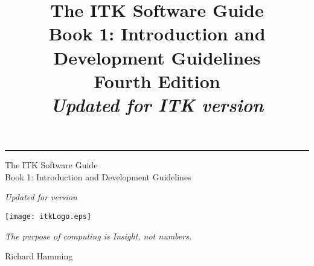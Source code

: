 \documentclass{InsightSoftwareGuide}
\title{The ITK Software Guide\\Book 1: Introduction and Development Guidelines\\Fourth Edition\\ \emph{Updated for ITK version
\ITKVERSIONMAJORMINOR}}
\begin{document}
\ifitkPrintedVersion

  \begin{minipage}[t][3cm][b]{\textwidth}
  \rule{14cm}{1pt}
  \end{minipage}

  \begin{minipage}[t][3cm][b]{\textwidth}
  \Huge
  The ITK Software Guide\\
  Book 1: Introduction and Development Guidelines\\
  \normalsize
  \par
  \emph{Updated for version \ITKVERSIONMAJORMINOR}\\

  \end{minipage}

  
  

\fi

\maketitle
\ifitkPrintedVersion
\fi

\frontmatter



%
%
%
\cleardoublepage

\begin{minipage}[t][10cm][b]{\textwidth}
\center
\texttt{[image: itkLogo.eps]}
\large
\begin{center}
\emph{The purpose of computing is Insight, not numbers.}\\
\end{center}
\hspace{8cm} Richard Hamming
\normalsize
\end{minipage}



%
\pagestyle{plain}
%


\ifitkPrintedVersion
  
\fi

\ifitkFullVersion
  
  
  
\fi
\end{document}

